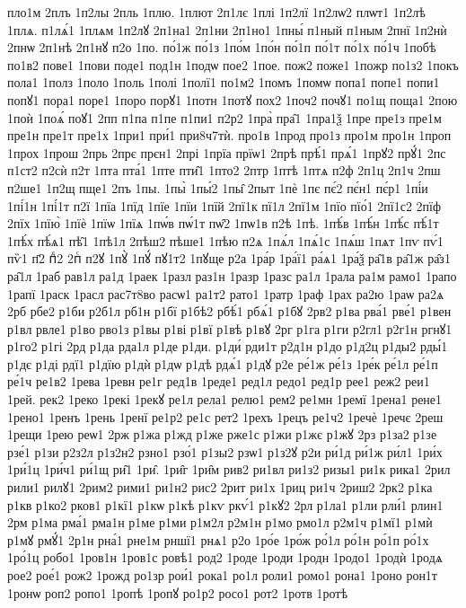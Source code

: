 {пло1м
2плъ
1п2лы
2пль
1плю.
1плют
2п1лє
1плі
1п2лї
1п2лѡ2
плѡт1
1п2лѣ
1плѧ.
п1лѧ́1
1плѧм
1п2лꙋ
2п1на1
2п1ни
2п1но1
1пны́
п1ный
п1ным
2пнї
1п2нѝ
2пнѡ
2п1нѣ
2п1нꙋ
п2о
1по.
по́1ж
по́1з
1по́м
1по́н
по́1п
по́1т
по́1х
по́1ч
1побѣ
по1в2
пове1
1пови
поде1
под1н
1подѡ
пое2
1пое.
пож2
поже1
1пожр
по1з2
1покъ
пола1
1полз
1поло
1поль
1полі
1полї1
по1м2
1помъ
1помѡ
попа1
попе1
попи1
попꙋ1
пора1
поре1
1поро
порꙋ1
1потн
1потꙋ
пох2
1поч2
почꙋ1
по1щ
поща1
2пою
1поѝ
1поѧ́
поꙋ1
2пп
п1па
п1пе
п1пи1
п2р2
1пра̀
пра̑1
1пра1ѯ
1пре
пре1з
пре1м
пре1н
пре1т
пре1х
1при1
при́1
при8ч7тѝ.
про1в
1прод
про1з
про1м
про1н
1проп
1прох
1прош
2прь
2прє
прєн1
2прі
1прїа
прїѡ1
2прѣ
прѣ́1
прѧ́1
1прꙋ2
прꙋ́1
2пс
п1ст2
п2сѝ
п2т
1пта
пта́1
1пте
пти̑1
1пто2
2птр
1птѣ
1птѧ
п2ф
2п1ц
2п1ч
2пш
п2ше1
1п2щ
пще1
2пъ
1пы.
1пы̀
1пы́2
1пы̑
2пыт
1пѐ
1пє
пє́2
пє́н1
пє́р1
1пі́и
1пі́1н
1пі́1т
п2ї
1пїа
1пїд
1пїе
1пїи
1пїй
2пї1к
пї1л
2пї1м
1пїо
пїо́1
2пї1с2
2пїф
2пїх
1пїю̀
1пїѐ
1пїѡ
1пїѧ
1пѡ́в
пѡ́1т
пѡ̑2
1пѡ1в
п2ѣ
1пѣ.
1пѣ́в
1пѣ́н
1пѣ́с
пѣ́1т
1пѣ́х
пѣ́ѧ1
пѣ̑1
1пѣ1л
2пѣш2
пѣше1
1пѣю
п2ѧ
1пѧ́л
1пѧ́1с
1пѧ́ш
1пѧт
1пѵ
пѵ́1
пѷ1
п҃2
пⷣ2
2пⷭ
п2ꙋ
1пꙋ̀
1пꙋ́
пꙋ1т2
1пꙋще
р2а
1ра́р
1ра́ї1
ра́ѧ1
1ра́ѯ
ра̑1в
ра̑1ж
ра̑з1
ра̑1л
1раб
рав1л
ра1д
1раек
1разл
раз1н
1разр
1разс
ра1л
1рала
ра1м
рамо1
1рапо
1рапї
1раск
1расл
рас7т8во
расѡ1
ра1т2
рато1
1ратр
1раф
1рах
ра2ю
1раѡ
ра2ѧ
2рб
рбе2
р1би
р2б1л
рб1н
р1бї
р1бѣ2
рбѣ́1
рбѧ́1
р1бꙋ
2рв2
р1ва
рва́1
рве́1
р1вен
р1вл
рвле1
р1во
рво1з
р1вы
р1ві
р1вї
р1вѣ
р1вꙋ
2рг
р1га
р1ги
р2гл1
р2г1н
ргнꙋ1
р1го2
р1гі
2рд
р1да
рда1л
р1де
р1ди.
р1ди́
рди1т
р2д1н
р1до
р1д2ц
р1ды2
рды́1
р1дє
р1ді
рдї1
р1дїю
р1дѝ
р1дѡ
р1дѣ
рдѧ́1
р1дꙋ
р2е
ре́1ж
ре́1з
1ре́к
ре́1л
ре́1п
ре́1ч
ре1в2
1рева
1ревн
ре1г
ред1в
1реде1
ред1л
редо1
ред1р
рее1
реж2
реи1
1рей.
рек2
1реко
1рекі
1рекꙋ
ре1л
рела1
релю1
рем2
ре1мн
1ремї
1рена1
рене1
1рено1
1ренъ
1рень
1ренї
ре1р2
ре1с
рет2
1рехъ
1рецъ
ре1ч2
1речѐ
1речє
2реш
1рещи
1рею
реѡ1
2рж
р1жа
р1жд
р1же
рже1с
р1жи
р1жє
р1жꙋ
2рз
р1за2
р1зе
рзе́1
р1зи
р2з2л
р1з2н2
рзно1
рзо́1
р1зы2
рзѡ1
р1з2ꙋ
р2и
ри́1д
ри́1ж
ри́л1
1ри́х
1ри́1ц
1ри́ч1
ри́1щ
ри̑1
1ри̑.
1ри̑г
1ри̑м
рив2
ри1вл
ри1з2
ризы1
ри1к
рика1
2рил
рили1
рилꙋ1
2рим2
рими1
ри1н2
рис2
2рит
ри1х
1риц
ри1ч
2риш2
2рк2
р1ка
р1кв
р1ко2
рков1
р1кї1
р1кѡ
р1кѣ
р1кѵ
ркѵ́1
р1кꙋ2
2рл
р1ла1
р1ли
рли́1
рлин1
2рм
р1ма
рма́1
рма1н
р1ме
р1ми
р1м2л
р2м1н
р1мо
рмо1л
р2м1ч
р1мї1
р1мѝ
р1мꙋ
рмꙋ́1
2р1н
рна́1
рне1м
рншї1
рнѧ1
р2о
1ро́е
1ро́ж
ро́1л
ро́1н
ро́1п
ро́1х
1ро́1ц
робо1
1ров1н
1ров1с
ровѣ1
род2
1роде
1роди
1родн
1родо1
1родѝ
1родѧ
рое2
рое́1
рож2
1рожд
ро1зр
рои́1
рока1
ро1л
роли1
ромо1
рона1
1роно
рон1т
1ронѡ
роп2
ропо1
1ропѣ
1ропꙋ
ро1р2
росо1
рот2
1ротв
1ротѣ
}

